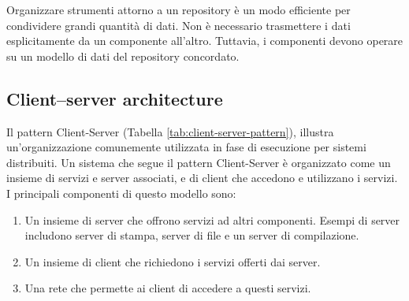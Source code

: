 Organizzare strumenti attorno a un repository è un modo efficiente per condividere grandi quantità di dati. Non è necessario trasmettere i dati esplicitamente da un componente all'altro. Tuttavia, i componenti devono operare su un modello di dati del repository concordato.

\subsection{Client–server architecture}
Il pattern Client-Server (Tabella \ref{tab:client-server-pattern}), illustra un'organizzazione comunemente utilizzata in fase di esecuzione per sistemi distribuiti. Un sistema che segue il pattern Client-Server è organizzato come un insieme di servizi e server associati, e di client che accedono e utilizzano i servizi. I principali componenti di questo modello sono:
\begin{enumerate}
    \item Un insieme di server che offrono servizi ad altri componenti. Esempi di server includono server di stampa, server di file e un server di compilazione.
    \item Un insieme di client che richiedono i servizi offerti dai server.
    \item Una rete che permette ai client di accedere a questi servizi.
\end{enumerate}

